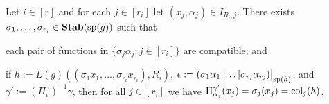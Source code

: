 \documentclass[../main/thesis.tex]{subfiles}
\begin{document}
\begin{lem}
  Let $i \in [r]$ and for each $j \in [r_i]$ let $(x_j, \alpha_j) \in I_{R_i,
    j}$. There exists $\sigma_1, \ldots, \sigma_{r_i} \in \text{\textbf{Stab}} (\text{sp} (g))$ such that
  \vspace{-1.5mm}
  \begin{myenum}
  \item\label{lem:defining-h-from-index--obj:1}each pair of functions in
    $\{\sigma_j \alpha_j : j \in [r_i]\}$ are compatible; and
  \item\label{lem:defining-h-from-index--obj:2}if $h := L(g)((\sigma_1 x_1,
    \ldots, \sigma_{r_i} x_{r_i}), R_i)$, $\epsilon := \restr{(\sigma_1 \alpha_1
      \vert \ldots \vert \sigma_{r_i} \alpha_{r_i})}{\consp(h)}$, and $\gamma'
    := (\Pi^{\gamma}_\epsilon)^{-1}\gamma$, then for all $j \in [r_i]$ we have
    $\Pi^{\gamma'}_{\alpha_j}(x_j) = \sigma_j (x_j) = \text{\upshape col}_{j}(h)$.
  \end{myenum}
  \label{lem:defining-h-from-index}
\end{lem}
\end{document}
